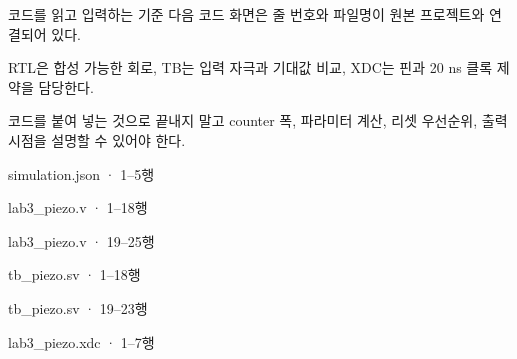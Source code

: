 \begin{frame}[label=code]{코드를 읽고 입력하는 기준}
\small
다음 코드 화면은 줄 번호와 파일명이 원본 프로젝트와 연결되어 있다.\par\vspace{0.25cm}
RTL은 합성 가능한 회로, TB는 입력 자극과 기대값 비교, XDC는 핀과 20 ns 클록 제약을 담당한다.\par\vspace{0.25cm}
코드를 붙여 넣는 것으로 끝내지 말고 counter 폭, 파라미터 계산, 리셋 우선순위, 출력 시점을 설명할 수 있어야 한다.
\end{frame}

\begin{frame}[fragile]{simulation.json · 1–5행}

\end{frame}

\begin{frame}[fragile]{lab3\_piezo.v · 1–18행}

\end{frame}

\begin{frame}[fragile]{lab3\_piezo.v · 19–25행}

\end{frame}

\begin{frame}[fragile]{tb\_piezo.sv · 1–18행}

\end{frame}

\begin{frame}[fragile]{tb\_piezo.sv · 19–23행}

\end{frame}

\begin{frame}[fragile]{lab3\_piezo.xdc · 1–7행}

\end{frame}


